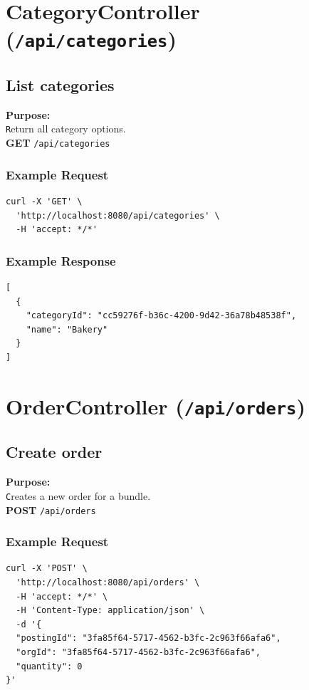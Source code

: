 \documentclass[a4paper,11pt]{article}
\begin{document}
\section{CategoryController (\texttt{/api/categories})}

\subsection{List categories}
\textbf{Purpose:} \\ \texttt Return all category options. \\

\textbf{GET} \texttt{/api/categories}

\subsubsection*{Example Request}
\begin{lstlisting}
curl -X 'GET' \
  'http://localhost:8080/api/categories' \
  -H 'accept: */*'
\end{lstlisting}

\subsubsection*{Example Response}
\begin{lstlisting}
[
  {
    "categoryId": "cc59276f-b36c-4200-9d42-36a78b48538f",
    "name": "Bakery"
  }
]
\end{lstlisting}

\section{OrderController (\texttt{/api/orders})}

\subsection{Create order}
\textbf{Purpose:} \\ \texttt Creates a new order for a bundle. \\

\textbf{POST} \texttt{/api/orders}

\subsubsection*{Example Request}
\begin{lstlisting}
curl -X 'POST' \
  'http://localhost:8080/api/orders' \
  -H 'accept: */*' \
  -H 'Content-Type: application/json' \
  -d '{
  "postingId": "3fa85f64-5717-4562-b3fc-2c963f66afa6",
  "orgId": "3fa85f64-5717-4562-b3fc-2c963f66afa6",
  "quantity": 0
}'
\end{lstlisting}
\end{document}
